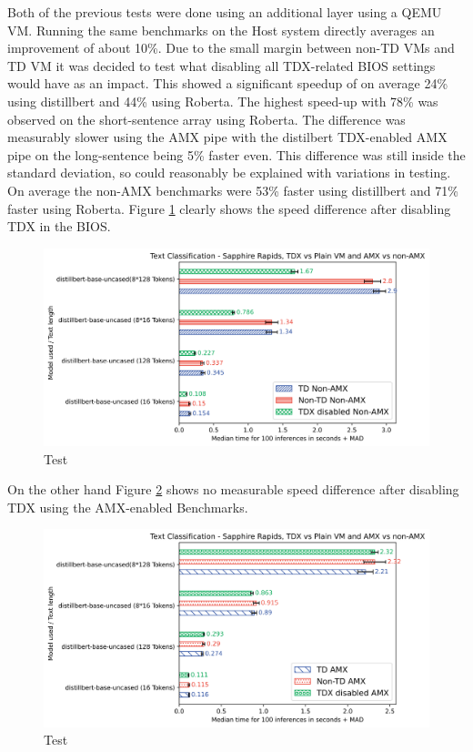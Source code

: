 Both of the previous tests were done using an additional layer using a QEMU VM. Running the same benchmarks on the Host system directly averages an improvement of about 10\%. 
Due to the small margin between non-TD VMs and TD VM it was decided to test what disabling all TDX-related BIOS settings \cite{getting-started} would have as an impact. This showed a significant speedup of on average 24\% using distillbert and 44\% using Roberta. The highest speed-up with 78\% was observed on the short-sentence array using Roberta. The difference was measurably slower using the AMX pipe with the distilbert TDX-enabled AMX pipe on the long-sentence being 5\% faster even. This difference was still inside the standard deviation, so could reasonably be explained with variations in testing. On average the non-AMX benchmarks were 53\% faster using distillbert and 71\% faster using Roberta. Figure \ref{fig:distillbertMADNONAMX} clearly shows the speed difference after disabling TDX in the BIOS. 
\begin{figure}
   \centering
       \includegraphics[width=.95\textwidth]{figures/distillbertMAD.png} 
 \caption{Test}
 \label{fig:distillbertMADNONAMX}
\end{figure}
On the other hand Figure \ref{fig:distillbertMADAMX} shows no measurable speed difference after disabling TDX using the AMX-enabled Benchmarks. 
\begin{figure}
   \centering
       \includegraphics[width=.95\textwidth]{figures/distillbertMADAMX.png} 
 \caption{Test}
 \label{fig:distillbertMADAMX}
\end{figure}
